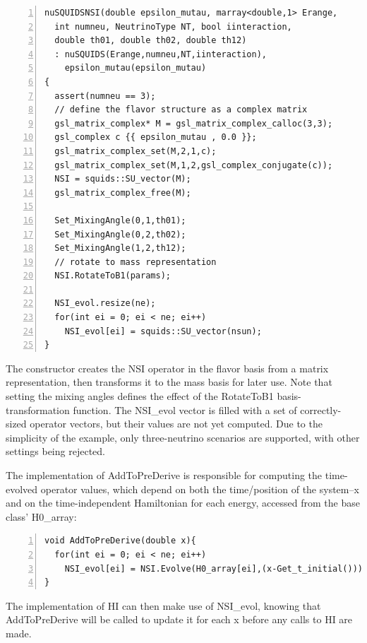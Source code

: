 \documentclass[3p,12pt]{elsarticle}
\newcommand{\ttf}{\ttfamily}
\begin{document}
\begin{lstlisting}[frame=leftline, numbers=left, breaklines=true, firstnumber=last]
nuSQUIDSNSI(double epsilon_mutau, marray<double,1> Erange, 
  int numneu, NeutrinoType NT, bool iinteraction,
  double th01, double th02, double th12)
  : nuSQUIDS(Erange,numneu,NT,iinteraction),
    epsilon_mutau(epsilon_mutau)
{
  assert(numneu == 3);
  // define the flavor structure as a complex matrix
  gsl_matrix_complex* M = gsl_matrix_complex_calloc(3,3);
  gsl_complex c {{ epsilon_mutau , 0.0 }};
  gsl_matrix_complex_set(M,2,1,c);
  gsl_matrix_complex_set(M,1,2,gsl_complex_conjugate(c));
  NSI = squids::SU_vector(M);
  gsl_matrix_complex_free(M);
  
  Set_MixingAngle(0,1,th01);
  Set_MixingAngle(0,2,th02);
  Set_MixingAngle(1,2,th12);
  // rotate to mass representation
  NSI.RotateToB1(params);

  NSI_evol.resize(ne);
  for(int ei = 0; ei < ne; ei++)
    NSI_evol[ei] = squids::SU_vector(nsun);
}
\end{lstlisting}
The constructor creates the NSI operator in the flavor basis from a matrix representation, then transforms it to the mass basis for later use. 
Note that setting the mixing angles defines the effect of the {\ttf RotateToB1} basis-transformation function. 
The {\ttf NSI\_evol} vector is filled with a set of correctly-sized operator vectors, but their values are not yet computed. 
Due to the simplicity of the example, only three-neutrino scenarios are supported, with other settings being rejected. 

The implementation of {\ttf AddToPreDerive} is responsible for computing the time-evolved operator values, which depend on both the time/position of the system--{\ttf x} and on the time-independent Hamiltonian for each energy, accessed from the base class' {\ttf H0\_array}:
\begin{lstlisting}[frame=leftline, numbers=left, breaklines=true, firstnumber=last]
void AddToPreDerive(double x){
  for(int ei = 0; ei < ne; ei++)
    NSI_evol[ei] = NSI.Evolve(H0_array[ei],(x-Get_t_initial()));
}
\end{lstlisting}
The implementation of {\ttf HI} can then make use of {\ttf NSI\_evol}, knowing that {\ttf AddToPreDerive} will be called to update it for each {\ttf x} before any calls to {\ttf HI} are made. 
\end{document}
